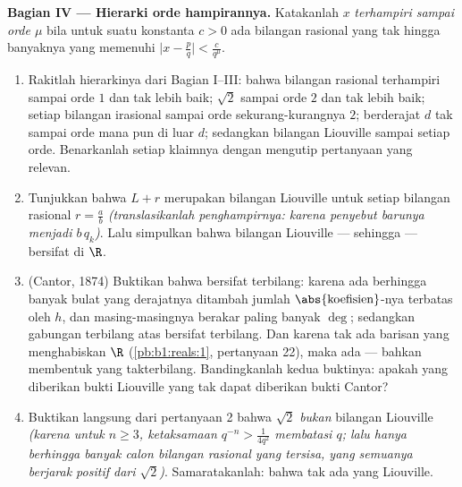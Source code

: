 \begin{problem}
\medskip
\noindent\textbf{Bagian IV --- Hierarki orde
hampirannya.} Katakanlah $x$ \emph{terhampiri sampai orde $\mu$} bila untuk
suatu konstanta $c > 0$ ada bilangan rasional yang tak hingga banyaknya yang memenuhi
$\bigl|x - \frac pq\bigr| < \frac{c}{q^{\mu}}$.
\begin{enumerate}[resume]
  \item Rakitlah hierarkinya dari Bagian I--III: bahwa bilangan rasional
        terhampiri sampai orde $1$ dan tak lebih baik; $\sqrt 2$ sampai
        orde $2$ dan tak lebih baik; setiap bilangan irasional sampai orde
        sekurang-kurangnya $2$;  berderajat $d$ tak sampai orde
        mana pun di luar $d$; sedangkan bilangan Liouville sampai setiap orde. Benarkanlah
        setiap klaimnya dengan mengutip pertanyaan yang relevan.
  \item Tunjukkan bahwa $L + r$ merupakan bilangan Liouville untuk setiap
        bilangan rasional $r = \frac ab$ \emph{(translasikanlah
        penghampirnya: karena penyebut barunya menjadi $b\,q_k$)}.
        Lalu simpulkan bahwa bilangan Liouville --- sehingga  ---
        bersifat  di $\R$.
  \item (Cantor, 1874) Buktikan bahwa  
        bersifat terbilang: karena ada berhingga banyak 
        bulat yang derajatnya ditambah jumlah $\abs{\text{koefisien}}$-nya
        terbatas oleh $h$, dan masing-masingnya berakar paling banyak $\deg$; sedangkan
        gabungan terbilang atas  bersifat terbilang. Dan karena tak ada
        barisan yang menghabiskan $\R$ (\cref{pb:b1:reals:1}, pertanyaan
        22), maka  ada --- bahkan membentuk 
        yang takterbilang. Bandingkanlah kedua buktinya: apakah yang diberikan
        bukti Liouville yang tak dapat diberikan bukti Cantor?
  \item Buktikan langsung dari pertanyaan 2 bahwa $\sqrt 2$
        \emph{bukan} bilangan Liouville \emph{(karena untuk $n \geq 3$,
        ketaksamaan $q^{-n} > \frac{1}{4q^2}$ membatasi $q$;
        lalu hanya berhingga banyak calon bilangan rasional yang tersisa, yang semuanya
        berjarak positif dari $\sqrt2$)}. Samaratakanlah:
        bahwa tak ada  yang Liouville.
\end{enumerate}


\end{problem}
